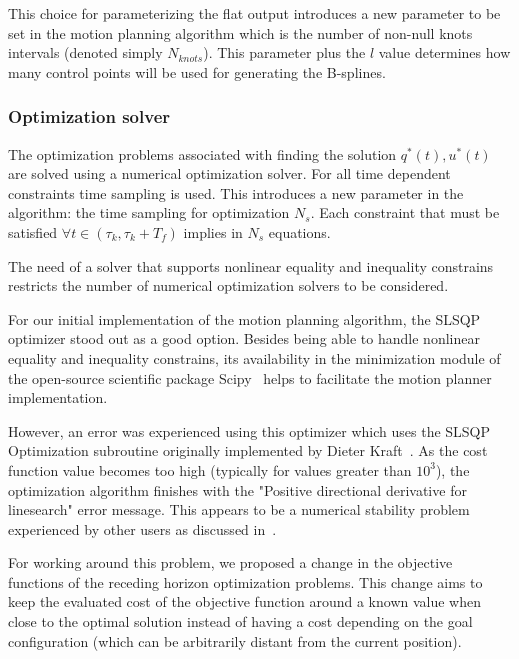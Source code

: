 \documentclass[eprint]{actapoly}
\begin{document}

This choice for parameterizing the flat output introduces a new parameter to be set in
the motion planning algorithm which is the number of non-null knots intervals 
(denoted simply $N_{knots}$). This parameter plus the $l$ value determines how many 
control points will be used for generating the B-splines.

\subsubsection{Optimization solver}


The optimization problems associated with finding the solution $q^*(t), u^*(t)$
are solved using a numerical optimization solver. For all time dependent constraints time sampling is used. This introduces
a new parameter in the algorithm: the time sampling for optimization $N_s$.
Each constraint that must be satisfied $\forall t \in (\tau_k, \tau_k + T_f)$ implies in $N_s$ equations.

The need of a solver that supports nonlinear equality and inequality constrains
restricts the number of numerical optimization solvers to be considered.

For our initial implementation of the motion planning algorithm, the
SLSQP optimizer stood out
as a good option. Besides being able to handle nonlinear equality and inequality 
constrains, its availability in the minimization module of the open-source
scientific package Scipy~\cite{Scipy} helps to facilitate the motion planner implementation.

However, an error was experienced using this optimizer which uses the SLSQP 
Optimization subroutine originally implemented by Dieter Kraft~\cite{Kraft1988}.
As the cost function value becomes too high (typically for values greater than 
$10^3$), the optimization algorithm finishes with the "Positive 
directional derivative for linesearch" error message. This appears to be
a numerical stability problem experienced by other users as discussed in~\cite{slsqperror}.

For working around this problem, we proposed a change in the objective functions
of the receding horizon optimization problems. This change aims to keep the 
evaluated cost of the objective function around a known value when close to the optimal
solution instead of having a cost depending on the goal configuration (which can be arbitrarily distant from the current position).
\end{document}

